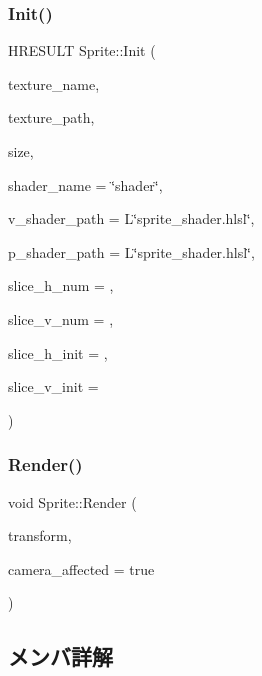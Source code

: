\subsubsection{\texorpdfstring{Init()}{Init()}}
{\footnotesize\ttfamily H\+R\+E\+S\+U\+LT Sprite\+::\+Init (\begin{DoxyParamCaption}\item[{const std\+::string \&}]{texture\+\_\+name,  }\item[{const W\+C\+H\+AR $\ast$}]{texture\+\_\+path,  }\item[{\mbox{\hyperlink{common_8h_ae148fff5818e9444b4ab2288829559bf}{Vec2}} \&}]{size,  }\item[{const std\+::string \&}]{shader\+\_\+name = {\ttfamily \char`\"{}shader\char`\"{}},  }\item[{const W\+C\+H\+AR $\ast$}]{v\+\_\+shader\+\_\+path = {\ttfamily L\char`\"{}sprite\+\_\+shader.hlsl\char`\"{}},  }\item[{const W\+C\+H\+AR $\ast$}]{p\+\_\+shader\+\_\+path = {\ttfamily L\char`\"{}sprite\+\_\+shader.hlsl\char`\"{}},  }\item[{const float}]{slice\+\_\+h\+\_\+num = {},  }\item[{const float}]{slice\+\_\+v\+\_\+num = {},  }\item[{const float}]{slice\+\_\+h\+\_\+init = {},  }\item[{const float}]{slice\+\_\+v\+\_\+init = {} }\end{DoxyParamCaption})}

\mbox{\label{class_sprite_a23296a54e3165adbbeb2b5351d04b921}} 
\subsubsection{\texorpdfstring{Render()}{Render()}}
{\footnotesize\ttfamily void Sprite\+::\+Render (\begin{DoxyParamCaption}\item[{const \mbox{\hyperlink{common_8h_a1c43cb8f0d8a41901f3ce4c67dbbce20}{Transform}} \&}]{transform,  }\item[{const bool}]{camera\+\_\+affected = {\ttfamily true} }\end{DoxyParamCaption})}



\subsection{メンバ詳解}
\mbox{\label{class_sprite_a7d4903c9693bbb41094b395fe587bf47}} 
